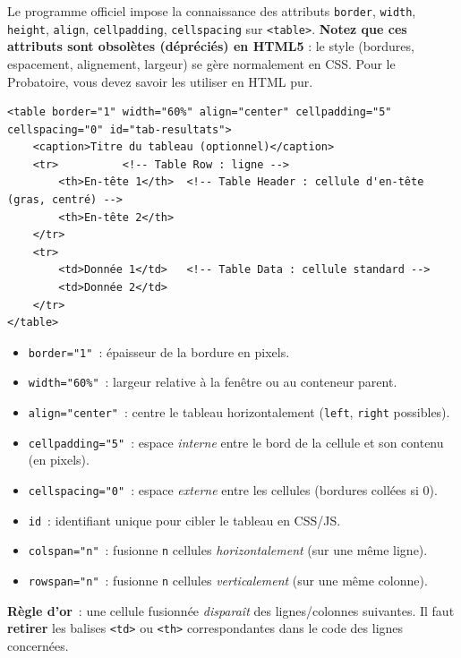 \documentclass[11pt]{article}
\newcounter{popsec}
\newcounter{popsub}
\newcommand{\courssub}[1]{%
  \stepcounter{popsub}%
  \par\vspace{9pt}\noindent{\popxbold\fontsize{11.5}{13}\selectfont\color{popink}{\color{poporange}\thepopsec.\thepopsub}\hspace{6pt}#1}\par\nopagebreak\vspace{4pt}
}
\begin{document}
\courssub{Les tableaux en HTML}

\begin{attention}
Le programme officiel impose la connaissance des attributs \texttt{border}, \texttt{width}, \texttt{height}, \texttt{align}, \texttt{cellpadding}, \texttt{cellspacing} sur \texttt{<table>}. \textbf{Notez que ces attributs sont obsolètes (dépréciés) en HTML5} : le style (bordures, espacement, alignement, largeur) se gère normalement en CSS. Pour le Probatoire, vous devez savoir les utiliser en HTML pur.
\end{attention}

\begin{propriete}
\begin{lstlisting}
<table border="1" width="60%" align="center" cellpadding="5" cellspacing="0" id="tab-resultats">
    <caption>Titre du tableau (optionnel)</caption>
    <tr>          <!-- Table Row : ligne -->
        <th>En-tête 1</th>  <!-- Table Header : cellule d'en-tête (gras, centré) -->
        <th>En-tête 2</th>
    </tr>
    <tr>
        <td>Donnée 1</td>   <!-- Table Data : cellule standard -->
        <td>Donnée 2</td>
    </tr>
</table>
\end{lstlisting}
\begin{itemize}
\item \texttt{border="1"}~: épaisseur de la bordure en pixels.
\item \texttt{width="60\%"}~: largeur relative à la fenêtre ou au conteneur parent.
\item \texttt{align="center"}~: centre le tableau horizontalement (\texttt{left}, \texttt{right} possibles).
\item \texttt{cellpadding="5"}~: espace \emph{interne} entre le bord de la cellule et son contenu (en pixels).
\item \texttt{cellspacing="0"}~: espace \emph{externe} entre les cellules (bordures collées si 0).
\item \texttt{id}~: identifiant unique pour cibler le tableau en CSS/JS.
\end{itemize}
\end{propriete}

\begin{propriete}
\begin{itemize}
\item \texttt{colspan="n"}~: fusionne \texttt{n} cellules \emph{horizontalement} (sur une même ligne).
\item \texttt{rowspan="n"}~: fusionne \texttt{n} cellules \emph{verticalement} (sur une même colonne).
\end{itemize}
\textbf{Règle d'or}~: une cellule fusionnée \emph{disparaît} des lignes/colonnes suivantes. Il faut \textbf{retirer} les balises \texttt{<td>} ou \texttt{<th>} correspondantes dans le code des lignes concernées.
\end{propriete}
\end{document}
